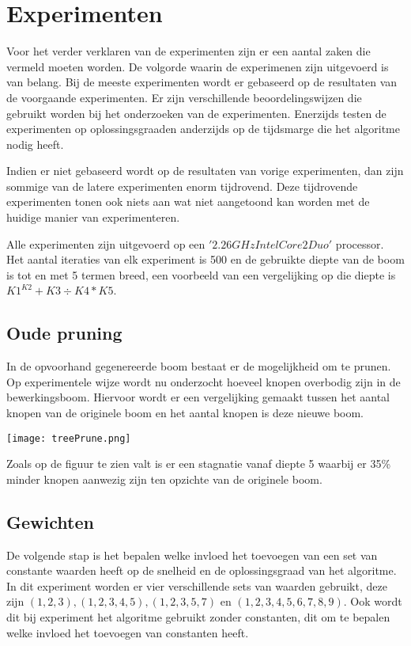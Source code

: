 \documentclass[Main.tex]{subfiles}
\begin{document}
\section{Experimenten}
Voor het verder verklaren van de experimenten zijn er een aantal zaken die vermeld moeten worden. De volgorde waarin de experimenen zijn uitgevoerd is van belang. Bij de meeste experimenten wordt er gebaseerd op de resultaten van de voorgaande experimenten. Er zijn verschillende beoordelingswijzen die gebruikt worden bij het onderzoeken van de experimenten. Enerzijds testen de experimenten op oplossingsgraad\footnotemark[\ref{note:oplossingsgraad}] en anderzijds op de tijdsmarge die het algoritme nodig heeft. 
\par
Indien er niet gebaseerd wordt op de resultaten van vorige experimenten, dan zijn sommige van de latere experimenten enorm tijdrovend. Deze tijdrovende experimenten tonen ook niets aan wat niet aangetoond kan worden met de huidige manier van experimenteren.
\par
Alle experimenten zijn uitgevoerd op een $'2.26 GHz Intel Core 2 Duo'$ processor. Het aantal iteraties van elk experiment is 500 en de gebruikte diepte van de boom is tot en met 5 termen breed, een voorbeeld van een vergelijking op die diepte is $K1^{K2}+K3 \div K4*K5$.

\subsection{Oude pruning}

In de opvoorhand gegenereerde boom bestaat er de mogelijkheid om te prunen. Op experimentele wijze wordt nu onderzocht hoeveel knopen overbodig zijn in de bewerkingsboom. Hiervoor wordt er een vergelijking gemaakt tussen het aantal knopen van de originele boom en het aantal knopen is deze nieuwe boom.
\begin{center}
\texttt{[image: treePrune.png]}
\end{center}
Zoals op de figuur te zien valt is er een stagnatie vanaf diepte 5 waarbij er 35\% minder knopen aanwezig zijn ten opzichte van de originele boom. 

\subsection{Gewichten}
De volgende stap is het bepalen welke invloed het toevoegen van een set van constante waarden heeft op de snelheid en de oplossingsgraad van het algoritme. In dit experiment worden er vier verschillende sets van waarden gebruikt, deze zijn $(1,2,3), (1,2,3,4,5), (1,2,3,5,7)$ en $(1,2,3,4,5,6,7,8,9)$. Ook wordt dit bij experiment het algoritme gebruikt zonder constanten, dit om te bepalen welke invloed het toevoegen van constanten heeft.
\end{document}
